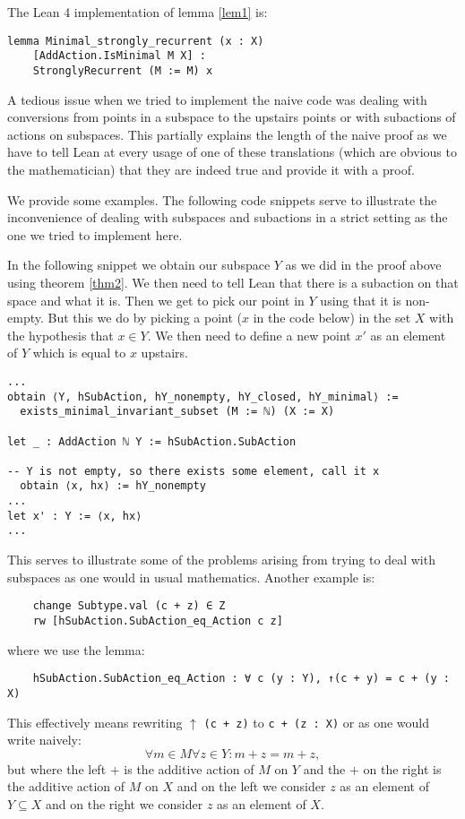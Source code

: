 \documentclass[11pt]{article}
\theoremstyle{definition}              %
\theoremstyle{definition}              %
\theoremstyle{definition}              %
\begin{document}
The Lean 4 implementation of lemma \ref{lem1} is:

\begin{lstlisting}
lemma Minimal_strongly_recurrent (x : X)
    [AddAction.IsMinimal M X] :
    StronglyRecurrent (M := M) x
\end{lstlisting}

A tedious issue when we tried to implement the naive code was dealing with conversions from points in a subspace to the upstairs points or with subactions of actions on subspaces. This partially explains the length of the naive proof as we have to tell Lean at every usage of one of these translations (which are obvious to the mathematician) that they are indeed true and provide it with a proof.

We provide some examples. The following code snippets serve to illustrate the inconvenience of dealing with subspaces and subactions in a strict setting as the one we tried to implement here. 

In the following snippet we obtain our subspace $Y$ as we did in the proof above using theorem \ref{thm2}. We then need to tell Lean that there is a subaction on that space and what it is. Then we get to pick our point in $Y$ using that it is non-empty. But this we do by picking a point ($x$ in the code below) in the set $X$ with the hypothesis that $x \in Y$. We then need to define a new point $x'$ as an element of $Y$ which is equal to $x$ upstairs.

\begin{lstlisting}
...
obtain ⟨Y, hSubAction, hY_nonempty, hY_closed, hY_minimal⟩ :=
  exists_minimal_invariant_subset (M := ℕ) (X := X)

let _ : AddAction ℕ Y := hSubAction.SubAction

-- Y is not empty, so there exists some element, call it x
  obtain ⟨x, hx⟩ := hY_nonempty
...
let x' : Y := ⟨x, hx⟩
...
\end{lstlisting}

This serves to illustrate some of the problems arising from trying to deal with subspaces as one would in usual mathematics. Another example is:

\begin{lstlisting}
    change Subtype.val (c + z) ∈ Z
    rw [hSubAction.SubAction_eq_Action c z]
\end{lstlisting}
where we use the lemma:
\begin{lstlisting}
    hSubAction.SubAction_eq_Action : ∀ c (y : Y), ↑(c + y) = c + (y : X)
\end{lstlisting}
This effectively means rewriting $\uparrow$ \verb|(c + z)| to \verb|c + (z : X)| or as one would write naively:
\begin{equation}
    \forall m \in M \forall z \in Y: m+z = m+z,
\end{equation}
but where the left $+$ is the additive action of $M$ on $Y$ and the $+$ on the right is the additive action of $M$ on $X$ and on the left we consider $z$ as an element of $Y \subseteq X$ and on the right we consider $z$ as an element of $X$.
\end{document}
